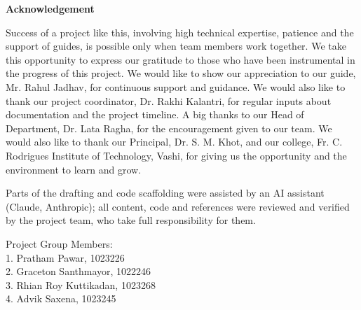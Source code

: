 \begin{center}{\LARGE\bf Acknowledgement}\end{center}
\justify
Success of a project like this, involving high technical expertise, patience and the support of guides, is possible only when team members work together. We take this opportunity to express our gratitude to those who have been instrumental in the progress of this project. We would like to show our appreciation to our guide, Mr. Rahul Jadhav, for continuous support and guidance. We would also like to thank our project coordinator, Dr. Rakhi Kalantri, for regular inputs about documentation and the project timeline. A big thanks to our Head of Department, Dr. Lata Ragha, for the encouragement given to our team. We would also like to thank our Principal, Dr. S. M. Khot, and our college, Fr. C. Rodrigues Institute of Technology, Vashi, for giving us the opportunity and the environment to learn and grow.

\medskip\noindent Parts of the drafting and code scaffolding were assisted by an AI assistant (Claude, Anthropic); all content, code and references were reviewed and verified by the project team, who take full responsibility for them.
\vspace{1.2cm}
\begin{flushright}
Project Group Members:\\[0.5cm]
1. Pratham Pawar, 1023226\\[0.3cm]
2. Graceton Santhmayor, 1022246\\[0.3cm]
3. Rhian Roy Kuttikadan, 1023268\\[0.3cm]
4. Advik Saxena, 1023245
\end{flushright}
